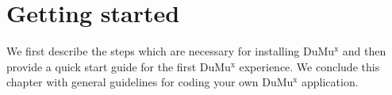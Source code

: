 \chapter{Getting started}

We first describe the steps which are necessary for installing DuMu$^\text{x}$ 
and then provide a quick start guide for the first DuMu$^\text{x}$ experience. 
We conclude this chapter with general guidelines for coding your own 
DuMu$^\text{x}$ application. 




